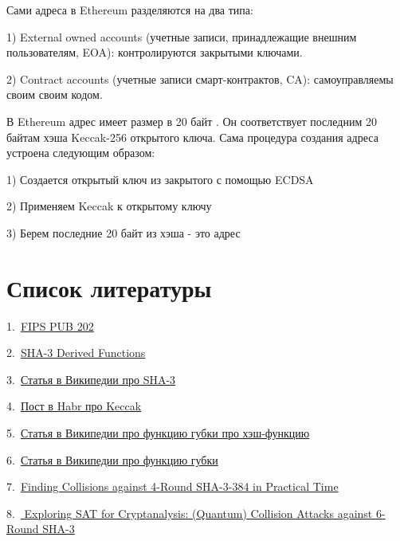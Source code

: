 \documentclass[a4paper,12pt]{article}
\theoremstyle{plain} %
\theoremstyle{definition} %
\theoremstyle{remark} %
\begin{document}
	Сами адреса в Ethereum разделяются на два типа:
	
	1) External owned accounts (учетные записи, принадлежащие внешним пользователям, EOA): контролируются закрытыми ключами.
	
	2) Contract accounts (учетные записи смарт-контрактов, CA): самоуправляемы своим своим кодом.
	
	В Ethereum  адрес имеет размер в 20 байт . Он соответствует последним 20 байтам хэша Keccak-256 открытого ключа. Сама процедура создания адреса устроена следующим образом:
	
	1) Создается открытый ключ из закрытого с помощью ECDSA
	
	2) Применяем Keccak к открытому ключу
	
	3) Берем последние 20 байт из хэша - это адрес
	
	\section{Список литературы}
	
	1.\ \href{https://dx.doi.org/10.6028%2Fnist.fips.202}{FIPS PUB 202}

	
	2.\ \href{https://doi.org/10.6028/NIST.SP.800-185}{SHA-3 Derived Functions}
	
	3.\ \href{https://ru.wikipedia.org/wiki/SHA-3}{Статья в Википедии про SHA-3}
	
	4.\ \href{https://habr.com/ru/post/534082/}{Пост в Habr про Keccak}
	
	5.\ \href{https://ru.wikipedia.org/wiki/Хеш-функция}{Статья в Википедии про функцию губки про хэш-функцию}
	
	6.\ \href{https://ru.wikipedia.org/wiki/Функция_губки}{Статья в Википедии про функцию губки}
	
	7.\ \href{https://docs.yandex.ru/docs/view?tm=1670581012&tld=ru&lang=en&name=194.pdf&text=Finding%20Collisions%20against%204-Round%20SHA-3-384%20in%20Practical%20Time&url=https%3A%2F%2Feprint.iacr.org%2F2022%2F194.pdf&lr=213&mime=pdf&l10n=ru&sign=df3555ad7abdca412bd3d1f72d819fd6&keyno=0&serpParams=tm%3D1670581012%26tld%3Dru%26lang%3Den%26name%3D194.pdf%26text%3DFinding%2BCollisions%2Bagainst%2B4-Round%2BSHA-3-384%2Bin%2BPractical%2BTime%26url%3Dhttps%253A%2F%2Feprint.iacr.org%2F2022%2F194.pdf%26lr%3D213%26mime%3Dpdf%26l10n%3Dru%26sign%3Ddf3555ad7abdca412bd3d1f72d819fd6%26keyno%3D0}{Finding Collisions against 4-Round SHA-3-384 in Practical Time}
	
	8.\ \href{https://docs.yandex.ru/docs/view?tm=1670581674&tld=ru&lang=en&name=184.pdf&text=Exploring%20SAT%20for%20Cryptanalysis%3A%20(Quantum)%20Collision%20Attacks%20against%206-Round%20SHA-3&url=https%3A%2F%2Feprint.iacr.org%2F2022%2F184.pdf&lr=214&mime=pdf&l10n=ru&sign=0b0eb5e3f96ac5853b282eebfebc9e20&keyno=0&serpParams=tm%3D1670581674%26tld%3Dru%26lang%3Den%26name%3D184.pdf%26text%3DExploring%2BSAT%2Bfor%2BCryptanalysis%253A%2B%2528Quantum%2529%2BCollision%2BAttacks%2Bagainst%2B6-Round%2BSHA-3%26url%3Dhttps%253A%2F%2Feprint.iacr.org%2F2022%2F184.pdf%26lr%3D214%26mime%3Dpdf%26l10n%3Dru%26sign%3D0b0eb5e3f96ac5853b282eebfebc9e20%26keyno%3D0}{ Exploring SAT for Cryptanalysis: (Quantum) Collision Attacks against 6-Round SHA-3}
	
\end{document}
